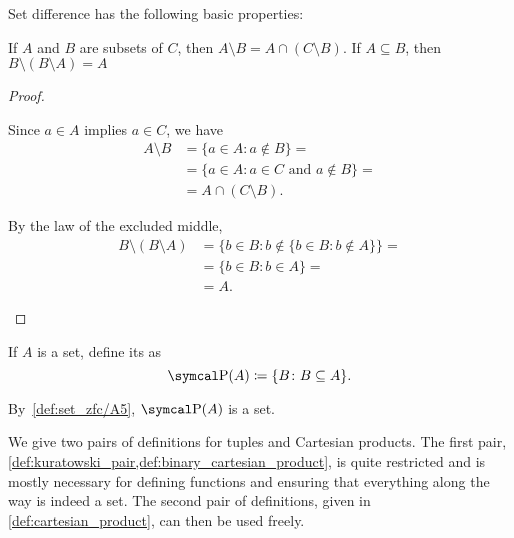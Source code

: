 \begin{proposition}\label{thm:set_difference_properties}
  Set difference has the following basic properties:
  \begin{propenum}
     If \( A \) and \( B \) are subsets of \( C \), then \( A \setminus B = A \cap (C \setminus B) \).
     If \( A \subseteq B \), then \( B \setminus (B \setminus A) = A \)
  \end{propenum}
\end{proposition}
\begin{proof}
  \begin{description}
     Since \( a \in A \) implies \( a \in C \), we have
    \begin{align*}
      A \setminus B
      &=
      \{ a \in A \colon a \not\in B \}
      = \\ &=
      \{ a \in A \colon a \in C \text{ and } a \not\in B \}
      = \\ &=
      A \cap (C \setminus B).
    \end{align*}

     By the law of the excluded middle,
    \begin{align*}
      B \setminus (B \setminus A)
      &=
      \{ b \in B \colon b \not\in \{ b \in B \colon b \not\in A \} \}
      = \\ &=
      \{ b \in B \colon b \in A \}
      = \\ &=
      A.
    \end{align*}
  \end{description}
\end{proof}

\begin{definition}\label{def:power_set}\cite[19]{Enderton1977}
  If \( A \) is a set, define its  as
  \begin{equation*}
    \Power(A) \coloneqq \{ B \colon B \subseteq A \}.
  \end{equation*}

  By~\ref{def:set_zfc/A5}, \( \Power(A) \) is a set.
\end{definition}

\begin{remark}\label{remark:binary_vs_arbitrary_tuples}
  We give two pairs of definitions for tuples and Cartesian products. The first pair, \cref{def:kuratowski_pair,def:binary_cartesian_product}, is quite restricted and is mostly necessary for defining functions and ensuring that everything along the way is indeed a set. The second pair of definitions, given in \cref{def:cartesian_product}, can then be used freely.
\end{remark}

